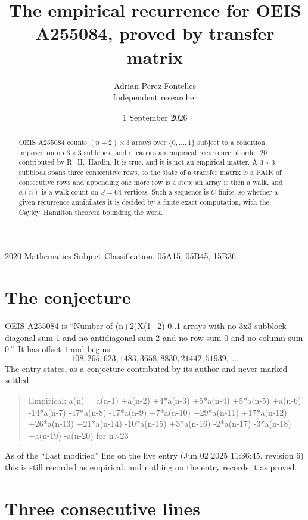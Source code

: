 \documentclass[11pt,a4paper]{article}
\title{The empirical recurrence for OEIS A255084, proved by transfer matrix}
\author{Adrian Perez Fontelles\\ \small Independent researcher}
\date{1 September 2026}
\theoremstyle{plain}
\theoremstyle{definition}
\begin{document}
\maketitle

\begin{abstract}
OEIS A255084 counts $(n+2)\times3$ arrays over $\{0,\dots,1\}$ subject to a condition imposed on
no $3\times3$ subblock, and it carries an empirical recurrence of order $20$
contributed by R.~H.~Hardin. It is true, and it is not an empirical matter. A $3\times3$
subblock spans three consecutive rows, so the state of a transfer matrix is a PAIR of
consecutive rows and appending one more row is a step; an array is then a walk, and
$a(n)$ is a walk count on $S=64$ vertices. Such a sequence is $C$-finite, so whether a given
recurrence annihilates it is decided by a finite exact computation, with the Cayley--Hamilton
theorem bounding the work.
\end{abstract}

\noindent\small 2020 Mathematics Subject Classification. 05A15, 05B45, 15B36.\normalsize

\section{The conjecture}

OEIS A255084 is ``Number of (n+2)X(1+2) 0..1 arrays with no 3x3 subblock diagonal sum 1 and no antidiagonal sum 2 and no row sum 0 and no column sum 0.''. It has offset $1$ and begins
\[
108, 265, 623, 1483, 3658, 8830, 21442, 51939,\ \dots
\]
The entry states, as a conjecture contributed by its author and never marked settled:
\begin{quote}
Empirical: a(n) = a(n-1) +a(n-2) +4*a(n-3) +5*a(n-4) +5*a(n-5) +a(n-6) -14*a(n-7) -47*a(n-8) -17*a(n-9) +7*a(n-10) +29*a(n-11) +17*a(n-12) +26*a(n-13) +21*a(n-14) -10*a(n-15) +3*a(n-16) -2*a(n-17) -3*a(n-18) +a(n-19) -a(n-20) for n>23
\end{quote}
As of the ``Last modified'' line on the live entry (Jun 02 2025 11:36:45, revision 6) this is still
recorded as empirical, and nothing on the entry records it as proved.

\section{Three consecutive lines}
\end{document}
